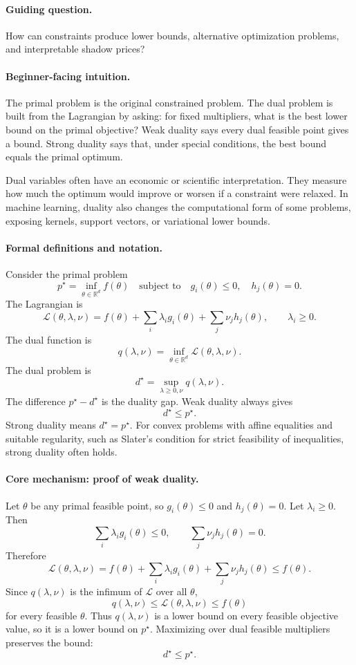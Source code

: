 \paragraph{Guiding question.}
How can constraints produce lower bounds, alternative optimization problems, and interpretable shadow prices?

\paragraph{Beginner-facing intuition.}
The primal problem is the original constrained problem. The dual problem is built from the Lagrangian by asking: for fixed multipliers, what is the best lower bound on the primal objective? Weak duality says every dual feasible point gives a bound. Strong duality says that, under special conditions, the best bound equals the primal optimum.

Dual variables often have an economic or scientific interpretation. They measure how much the optimum would improve or worsen if a constraint were relaxed. In machine learning, duality also changes the computational form of some problems, exposing kernels, support vectors, or variational lower bounds.

\paragraph{Formal definitions and notation.}
Consider the primal problem
\[
p^\star=
\inf_{\theta\in\mathbb R^d} f(\theta)
\quad\text{subject to}\quad
g_i(\theta)\le 0,\quad h_j(\theta)=0.
\]
The Lagrangian is
\[
\mathcal L(\theta,\lambda,\nu)
=f(\theta)+\sum_i\lambda_i g_i(\theta)+\sum_j\nu_j h_j(\theta),
\qquad
\lambda_i\ge 0.
\]
The dual function is
\[
\boxed{
q(\lambda,\nu)=\inf_{\theta\in\mathbb R^d}\mathcal L(\theta,\lambda,\nu).
}
\]
The dual problem is
\[
\boxed{
d^\star=\sup_{\lambda\ge 0,\nu} q(\lambda,\nu).
}
\]
The difference \(p^\star-d^\star\) is the duality gap. Weak duality always gives
\[
d^\star\le p^\star.
\]
Strong duality means \(d^\star=p^\star\). For convex problems with affine equalities and suitable regularity, such as Slater's condition for strict feasibility of inequalities, strong duality often holds.

\paragraph{Core mechanism: proof of weak duality.}
Let \(\theta\) be any primal feasible point, so \(g_i(\theta)\le 0\) and \(h_j(\theta)=0\). Let \(\lambda_i\ge 0\). Then
\[
\sum_i\lambda_i g_i(\theta)\le 0,
\qquad
\sum_j\nu_j h_j(\theta)=0.
\]
Therefore
\[
\mathcal L(\theta,\lambda,\nu)
=f(\theta)+\sum_i\lambda_i g_i(\theta)+\sum_j\nu_j h_j(\theta)
\le f(\theta).
\]
Since \(q(\lambda,\nu)\) is the infimum of \(\mathcal L\) over all \(\theta\),
\[
q(\lambda,\nu)\le \mathcal L(\theta,\lambda,\nu)\le f(\theta)
\]
for every feasible \(\theta\). Thus \(q(\lambda,\nu)\) is a lower bound on every feasible objective value, so it is a lower bound on \(p^\star\). Maximizing over dual feasible multipliers preserves the bound:
\[
d^\star\le p^\star.
\]

